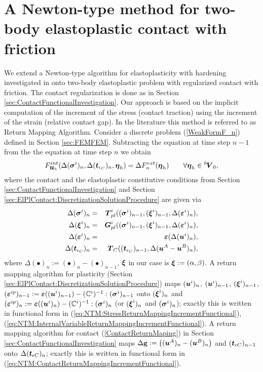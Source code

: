 \documentclass[12pt,a4paper]{scrbook}
\begin{document}
\section{A Newton-type method for two-body elastoplastic contact with friction}\label{sec:NewtonTypeMethod}
We extend a Newton-type algorithm for elastoplasticity with hardening investigated in \cite{Bl97,AxBlKo97}  onto two-body elastoplastic problem with regularized  contact  with friction. The contact regularization is done as in Section \ref{sec:ContactFunctionalInvestigation}. Our approach is based on the implicit computation of the increment of the stress (contact traction) using the increment of the strain (relative contact gap).  In the literature this method is referred to as Return Mapping Algorithm.
Consider  a discrete problem (\ref{WeakFormF_n}) defined in Section \ref{sec:FEMFEM}. Subtracting the equation at time step  $n-1$ from the the equation at time step $n$ we obtain
\begin{equation} \label{NTM:DeltaWeakFormF_n}
F^{int}_{\mbox{\boldmath$u$}_h}(\Delta(\mbox{\boldmath$\sigma$}^i)_{n},\Delta(\mbox{\boldmath$t$}_{\epsilon_C})_{n},\mbox{\boldmath$\eta$}_h) = \Delta F^{ext}_{n}(\mbox{\boldmath$\eta$}_h) \qquad \forall \mbox{\boldmath$\eta$}_h \in {}^h\!\mbox{\boldmath$V$}_0,
\end{equation}
where the contact and the elastoplastic constitutive conditions from Section \ref{sec:ContactFunctionalInvestigation} and Section \ref{sec:ElPlContact:DiscretizationSolutionProcedure} are given via
\begin{eqnarray}
\Delta(\mbox{\boldmath$\sigma$}^i)_{n}&=&\mbox{\boldmath$T$}^{i}_{pl}((\mbox{\boldmath$\sigma$}^i)_{n-1},(\mbox{\boldmath$\xi$}^i)_{n-1},\Delta(\mbox{\boldmath$\varepsilon$}^i)_{n}),\label{eq:NTM:StressReturnMappingIncrementFunctional} \\
\Delta(\mbox{\boldmath$\xi$}^i)_{n}&=&\mbox{\boldmath$G$}^{i}_{pl}((\mbox{\boldmath$\sigma$}^i)_{n-1},(\mbox{\boldmath$\xi$}^i)_{n-1},\Delta(\mbox{\boldmath$\varepsilon$}^i)_{n}),\label{eq:NTM:InternalVariableReturnMappingIncrementFunctional} \\
\Delta(\mbox{\boldmath$\varepsilon$}^i)_{n}&=&\mbox{\boldmath$\varepsilon$}(\Delta(\mbox{\boldmath$u$}^i)_{n}),\nonumber \\
\Delta(\mbox{\boldmath$t$}_{\epsilon_C})_{n}&=&\mbox{\boldmath$T$}_{C}((\mbox{\boldmath$t$}_{\epsilon_C})_{n-1},\Delta(\mbox{\boldmath$u$}^{A}-\mbox{\boldmath$u$}^{B})_{n}),\label{eq:NTM:ContactReturnMappingIncrementFunctional} 
\end{eqnarray}
where $\Delta(\bullet)_n:=(\bullet)_{n}-(\bullet)_{n-1}$, $\mbox{\boldmath$\xi$}$ in our case is $\mbox{\boldmath$\xi$}:=(\alpha,\beta)$. A return mapping algorithm for plasticity (Section \ref{sec:ElPlContact:DiscretizationSolutionProcedure}) maps $(\mbox{\boldmath$u$}^i)_{n}$, $(\mbox{\boldmath$u$}^i)_{n-1}$, $(\mbox{\boldmath$\xi$}^i)_{n-1}$, $(\mbox{\boldmath$\varepsilon$}^{ip})_{n-1}:=\mbox{\boldmath$\varepsilon$}((\mbox{\boldmath$u$}^{i})_{n-1})-({\mathbb C}^{i})^{-1}:(\mbox{\boldmath$\sigma$}^i)_{n-1}$ onto $(\mbox{\boldmath$\xi$}^i)_{n}$ and $(\mbox{\boldmath$\varepsilon$}^{ip})_{n}:=\mbox{\boldmath$\varepsilon$}((\mbox{\boldmath$u$}^{i})_{n})-({\mathbb C}^{i})^{-1}:(\mbox{\boldmath$\sigma$}^i)_{n}$ (or $(\mbox{\boldmath$\xi$}^i)_{n}$ and $(\mbox{\boldmath$\sigma$}^i)_{n}$); exactly this is  written in functional form in (\ref{eq:NTM:StressReturnMappingIncrementFunctional}), (\ref{eq:NTM:InternalVariableReturnMappingIncrementFunctional}).  A return mapping algorithm for contact (\ref{ContactReturnMaping}) in Section \ref{sec:ContactFunctionalInvestigation}  maps $\Delta \mbox{\boldmath$\mathrm{g}$}:= \left((\mbox{\boldmath$u$}^{A})_{n}-(\mbox{\boldmath$u$}^{B})_{n}\right)$ and  $(\mbox{\boldmath$t$}_{\epsilon C})_{n-1}$ onto  $\Delta (\mbox{\boldmath$t$}_{\epsilon C})_{n}$; exactly this is  written in functional form in (\ref{eq:NTM:ContactReturnMappingIncrementFunctional}).
\end{document}
